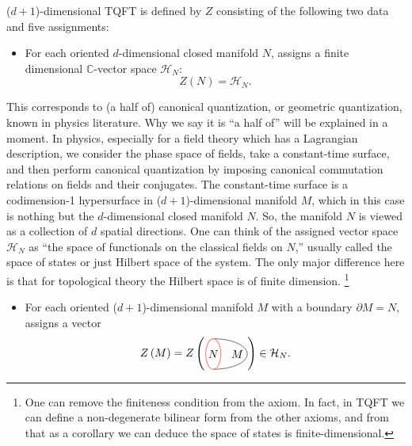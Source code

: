 ($d+1$)-dimensional TQFT is defined by $Z$ consisting of the following
two data and five assignments: 
\begin{itemize}
  \item For each oriented $d$-dimensional closed manifold $N$, assigns a
finite dimensional $\mathbb{C}$-vector space $\mathcal{H}_{N}$:
\begin{equation}
  Z\left(N\right)  =  \mathcal{H}_{N}.
\end{equation}
\end{itemize}
This corresponds to (a half of) canonical quantization, or geometric
quantization, known in physics literature. Why we say it is ``a half
of'' will be explained in a moment. In physics, especially for a
field theory which has a Lagrangian description, we consider the phase
space of fields, take a constant-time surface, and then perform canonical
quantization by imposing canonical commutation relations on fields
and their conjugates. The constant-time surface is a codimension-1
hypersurface in ($d+1$)-dimensional manifold $M$, which in this
case is nothing but the $d$-dimensional closed manifold $N$. So,
the manifold $N$ is viewed as a collection of $d$ spatial directions.
One can think of the assigned vector space $\mathcal{H}_{N}$ as ``the
space of functionals on the classical fields on $N$,'' usually called
the space of states or just Hilbert space of the system. The only
major difference here is that for topological theory the Hilbert space
is of finite dimension.%
%
\footnote{One can remove the finiteness condition from the axiom. In fact, in
TQFT we can define a non-degenerate bilinear form from the other axioms,
and from that as a corollary we can deduce the space of states is
finite-dimensional. }
% 
\begin{itemize}
  \item For each oriented ($d+1$)-dimensional manifold $M$ with a boundary
$\partial M=N$, assigns a vector 
\begin{equation}
  Z\left(M\right)
  =  
  Z\left(
    \begin{tikzpicture}[scale=0.6, baseline=(x.base)]    \node (x) at (0,0) {\vphantom{x}};
        \def\bdyradius{0.8cm}
        
        \draw (0,-\bdyradius) arc[start angle=-90,end angle=90,x radius=1.8cm,y radius=\bdyradius] node[left=0.1,pos=0.5] {$M$};
        \draw[thick, red!50] (0,0) node[black] {$N$} circle[x radius=0.4cm,y radius=\bdyradius];
        
    \end{tikzpicture}
  \right)
  \in  \mathcal{H}_{N}.
\end{equation}
\end{itemize}
